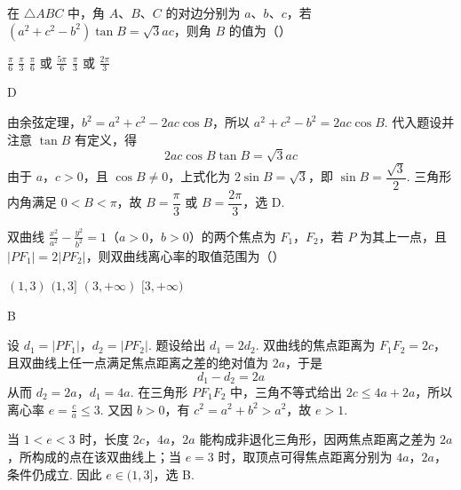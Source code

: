 \begin{problem}
在 \(\triangle ABC\) 中，角 \(A\)、\(B\)、\(C\) 的对边分别为 \(a\)、\(b\)、\(c\)，若 \((a^{2} + c^{2} - b^{2})\tan B = \sqrt{3}ac\)，则角 \(B\) 的值为（\quad）

\choices
    {\(\frac{\pi}{6}\)}
    {\( \frac{\pi}{3} \)}
    {\(\frac{\pi}{6}\) 或 \(\frac{5\pi}{6}\)}
    {\(\frac{\pi}{3}\) 或 \(\frac{2\pi}{3}\)}
\begin{answer}
D
\end{answer}
\begin{solution}
由余弦定理，\(b^2=a^2+c^2-2ac\cos B\)，所以 \(a^2+c^2-b^2=2ac\cos B\). 代入题设并注意 \(\tan B\) 有定义，得
\[
2ac\cos B\tan B=\sqrt3ac
\]
由于 \(a\)，\(c>0\)，且 \(\cos B\neq0\)，上式化为 \(2\sin B=\sqrt3\)，即 \(\sin B=\dfrac{\sqrt3}{2}\). 三角形内角满足 \(0<B<\pi\)，故 \(B=\dfrac\pi3\) 或 \(B=\dfrac{2\pi}3\)，选 D.
\end{solution}
\end{problem}

\begin{problem}
双曲线 \(\frac{x^2}{a^2} - \frac{y^2}{b^2} = 1\)（\(a > 0\)，\(b > 0\)）的两个焦点为 \(F_1\)，\(F_2\)，若 \(P\) 为其上一点，且 \(|PF_1| = 2|PF_2|\)，则双曲线离心率的取值范围为（\quad）

\choices
    {\((1,3)\)}
    {\((1,3]\)}
    {\( (3, +\infty) \)}
    {\([3, +\infty)\)}
\begin{answer}
B
\end{answer}
\begin{solution}
设 \(d_1=|PF_1|\)，\(d_2=|PF_2|\). 题设给出 \(d_1=2d_2\). 双曲线的焦点距离为 \(F_1F_2=2c\)，且双曲线上任一点满足焦点距离之差的绝对值为 \(2a\)，于是
\[
d_1-d_2=2a
\]
从而 \(d_2=2a\)，\(d_1=4a\). 在三角形 \(PF_1F_2\) 中，三角不等式给出 \(2c\leqslant4a+2a\)，所以离心率 \(e=\frac{c}{a}\leqslant3\). 又因 \(b>0\)，有 \(c^2=a^2+b^2>a^2\)，故 \(e>1\).

当 \(1<e<3\) 时，长度 \(2c\)，\(4a\)，\(2a\) 能构成非退化三角形，因两焦点距离之差为 \(2a\)，所构成的点在该双曲线上；当 \(e=3\) 时，取顶点可得焦点距离分别为 \(4a\)，\(2a\)，条件仍成立. 因此 \(e\in(1,3]\)，选 B.
\end{solution}
\end{problem}

